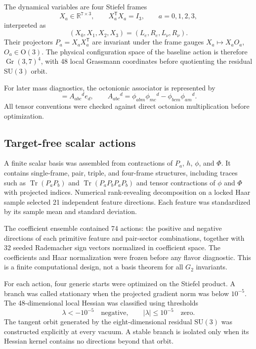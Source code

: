 \documentclass[11pt]{article}
\newcommand{\Gr}{\operatorname{Gr}}
\newcommand{\Tr}{\operatorname{Tr}}
\newcommand{\SU}{\mathrm{SU}}
\newcommand{\OO}{\mathrm{O}}
\begin{document}
The dynamical variables are four Stiefel frames
\begin{equation}
  X_a\in\mathbb R^{7\times 3},\qquad X_a^{\mathsf T}X_a=I_3,
  \qquad a=0,1,2,3,
\end{equation}
interpreted as
\begin{equation}
  (X_0,X_1,X_2,X_3)=(L_e,R_e,L_\nu,R_\nu).
\end{equation}
Their projectors $P_a=X_aX_a^{\mathsf T}$ are invariant under the frame gauges $X_a\mapsto X_aO_a$, $O_a\in\OO(3)$.  The physical configuration space of the baseline action is therefore $\Gr(3,7)^4$, with 48 local Grassmann coordinates before quotienting the residual $\SU(3)$ orbit.

For later mass diagnostics, the octonionic associator is represented by
\begin{equation}
  [e_a,e_b,e_c]=A_{abc}{}^d e_d,
  \qquad
  A_{abc}{}^d
  =\phi_{abm}\phi_{mc}{}^d-\phi_{bcm}\phi_{am}{}^d.
  \label{eq:associator}
\end{equation}
All tensor conventions were checked against direct octonion multiplication before optimization.

\subsection{Target-free scalar actions}

A finite scalar basis was assembled from contractions of $P_a$, $h$, $\phi$, and $\Phi$.  It contains single-frame, pair, triple, and four-frame structures, including traces such as $\Tr(P_aP_b)$ and $\Tr(P_aP_bP_aP_b)$ and tensor contractions of $\phi$ and $\Phi$ with projected indices.  Numerical rank-revealing decomposition on a locked Haar sample selected 21 independent feature directions.  Each feature was standardized by its sample mean and standard deviation.

The coefficient ensemble contained 74 actions: the positive and negative directions of each primitive feature and pair-sector combinations, together with 32 seeded Rademacher sign vectors normalized in coefficient space.  The coefficients and Haar normalization were frozen before any flavor diagnostic.  This is a finite computational design, not a basis theorem for all $G_2$ invariants.

For each action, four generic starts were optimized on the Stiefel product.  A branch was called stationary when the projected gradient norm was below $10^{-5}$.  The 48-dimensional local Hessian was classified using thresholds
\begin{equation}
  \lambda<-10^{-5}\quad\text{negative},\qquad
  |\lambda|\le 10^{-5}\quad\text{zero}.
  \label{eq:hessian-thresholds}
\end{equation}
The tangent orbit generated by the eight-dimensional residual $\SU(3)$ was constructed explicitly at every vacuum.  A stable branch is isolated only when its Hessian kernel contains no directions beyond that orbit.
\end{document}
